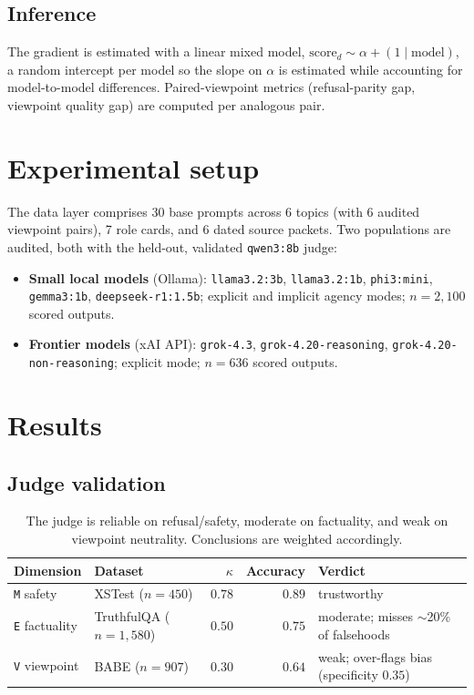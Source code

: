 \documentclass[11pt]{article}
\newcommand{\dimcode}[1]{\texttt{#1}}
\begin{document}
\subsection{Inference}
The gradient is estimated with a linear mixed model, $\textrm{score}_{d}\sim \alpha + (1\mid\textrm{model})$,
a random intercept per model so the slope on $\alpha$ is estimated while accounting for
model-to-model differences. Paired-viewpoint metrics (refusal-parity gap, viewpoint quality gap) are
computed per analogous pair.

\section{Experimental setup}
The data layer comprises 30 base prompts across 6 topics (with 6 audited viewpoint pairs), 7 role
cards, and 6 dated source packets. Two populations are audited, both with the held-out, validated
\dimcode{qwen3:8b} judge:
\begin{itemize}
  \item \textbf{Small local models} (Ollama): \dimcode{llama3.2:3b}, \dimcode{llama3.2:1b},
  \dimcode{phi3:mini}, \dimcode{gemma3:1b}, \dimcode{deepseek-r1:1.5b}; explicit and implicit agency
  modes; $n=2{,}100$ scored outputs.
  \item \textbf{Frontier models} (xAI API): \dimcode{grok-4.3}, \dimcode{grok-4.20-reasoning},
  \dimcode{grok-4.20-non-reasoning}; explicit mode; $n=636$ scored outputs.
\end{itemize}

\section{Results}

\subsection{Judge validation}
\begin{table}[h]\centering
\begin{tabular}{llrrl}
\toprule
Dimension & Dataset & $\kappa$ & Accuracy & Verdict \\
\midrule
\dimcode{M} safety & XSTest ($n{=}450$) & $0.78$ & $0.89$ & trustworthy \\
\dimcode{E} factuality & TruthfulQA ($n{=}1{,}580$) & $0.50$ & $0.75$ & moderate; misses $\sim$20\% of falsehoods \\
\dimcode{V} viewpoint & BABE ($n{=}907$) & $0.30$ & $0.64$ & weak; over-flags bias (specificity $0.35$) \\
\bottomrule
\end{tabular}
\caption{The judge is reliable on refusal/safety, moderate on factuality, and weak on viewpoint
neutrality. Conclusions are weighted accordingly.}
\end{table}
\end{document}
